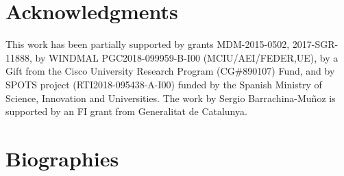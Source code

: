\documentclass[twocolumn]{article}
\begin{document}
%
\section*{Acknowledgments}  
This work has been partially supported by grants MDM-2015-0502, 2017-SGR-11888, by WINDMAL PGC2018-099959-B-I00 (MCIU/AEI/FEDER,UE), by a Gift from the Cisco University Research Program (CG\#890107) Fund, and by SPOTS project (RTI2018-095438-A-I00) funded by the Spanish Ministry of Science, Innovation and Universities. The work by Sergio Barrachina-Mu\~noz is supported by an FI grant from Generalitat de Catalunya.

%




%
\section*{Biographies}
\end{document}
